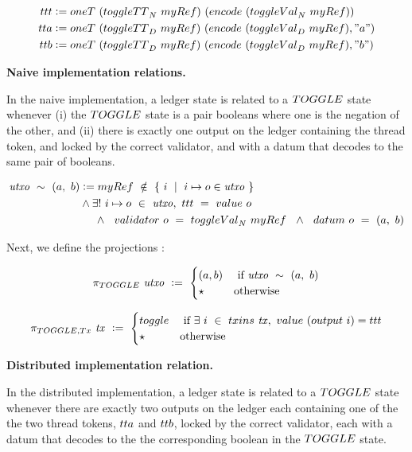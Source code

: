 \begin{align*}
  \fun{ttt} & \leteq \mathsf{oneT}~(\toggleTT_N~\mathsf{myRef})~(\fun{encode}~(\toggleVal_N~\mathsf{myRef})) \\
  \fun{tta} &\leteq \mathsf{oneT}~(\toggleTT_D~\mathsf{myRef})~(\fun{encode}~(\toggleVal_D~\mathsf{myRef}), "a") \\
  \fun{ttb} &\leteq \mathsf{oneT}~(\toggleTT_D~\mathsf{myRef})~(\fun{encode}~(\toggleVal_D~\mathsf{myRef}), "b")
\end{align*}

\textbf{Naive implementation relations. }

In the naive implementation, a ledger state is related to a $\TOGGLE$ state
whenever (i) the $\TOGGLE$ state is a pair booleans where one is the negation of the
other, and (ii) there is exactly one output on the ledger containing the thread token,
and locked by the correct validator, and with a datum that decodes to the same pair of booleans.

\begin{align*}
  \var{utxo}~\sim~(a,~b) &\leteq \mathsf{myRef}~\notin~\{ ~i~\mid~i\mapsto o \in  \var{utxo}~\} \\
  & \wedge \exists ! ~i\mapsto o~\in~\var{utxo},~\fun{ttt}~=~\val~o~ \\
  & ~~~~ \wedge~~\validator~o~=~\toggleVal_N~\mathsf{myRef}~~\wedge~~\datum~o~=~(a,~b)
\end{align*}

Next, we define the projections :

\begin{align*}
  \pi_{\TOGGLE}~\var{utxo}~ \leteq~\begin{cases}
    (a, b) & \text{ if } \var{utxo}~\sim~(a,~b) \\
    \emptytype & \text{otherwise}
  \end{cases}
\end{align*}

\begin{align*}
  \pi_{\TOGGLE,\Tx}~\var{tx}~ \leteq~\begin{cases}
    \toggle & \text{ if } \exists~i~ \in~\inputs~\var{tx},~\val~(\fun{output}~i) = \fun{ttt} \\
    \emptytype & \text{otherwise}
  \end{cases}
\end{align*}

\textbf{Distributed implementation relation. }

In the distributed implementation, a ledger state is related to a $\TOGGLE$ state
whenever there are exactly two outputs on the ledger each containing one of the
the two thread tokens, $\fun{tta}$ and $\fun{ttb}$,
locked by the correct validator, each with a datum that decodes to the the corresponding
boolean in the $\TOGGLE$ state.

